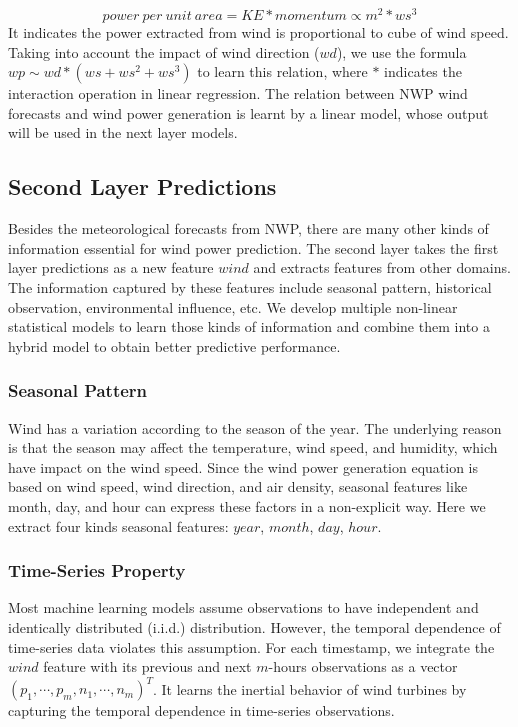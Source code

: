 \documentclass[conference]{IEEEtran}
\begin{document}
\begin{equation}
    power\ per\ unit\ area = KE*momentum \propto m^2*ws^3
\end{equation}
It indicates the power extracted from wind is proportional to cube of wind speed. Taking into account the impact of wind direction ($wd$), we use the formula $wp \sim wd * (ws + ws^2 + ws^3)$ to learn this relation,
where $*$ indicates the interaction operation in linear regression. The relation between NWP wind forecasts and wind power generation is learnt by a linear model, whose output will be used in the next layer models.


\subsection{Second Layer Predictions}
Besides the meteorological forecasts from NWP, there are many other kinds of information essential for wind power prediction. The second layer takes the first layer predictions as a new feature $wind$ and extracts features from other domains. The information captured by these features include seasonal pattern, historical observation, environmental influence, etc. We develop multiple non-linear statistical models to learn those kinds of information and combine them into a hybrid model to obtain better predictive performance.

\subsubsection{Seasonal Pattern}
Wind has a variation according to the season of the year. The underlying reason is that the season may affect the temperature, wind speed, and humidity, which have impact on the wind speed. Since the wind power generation equation is based on wind speed, wind direction, and air density, seasonal features like month, day, and hour can express these factors in a non-explicit way. Here we extract four kinds seasonal features: $year$, $month$, $day$, $hour$. %

\subsubsection{Time-Series Property}
Most machine learning models assume observations to have independent and identically distributed (i.i.d.) distribution. However, the temporal dependence of time-series data violates this assumption. For each timestamp, we integrate the $wind$ feature with its previous and next $m$-hours observations as a vector $(p_1,\cdots,p_m, n_1,\cdots,n_m)^T$. It learns the inertial behavior of wind turbines by capturing the temporal dependence in time-series observations.
\end{document}
